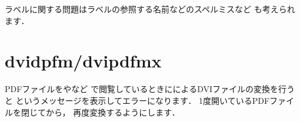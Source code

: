 ラベルに関する問題はラベルの参照する名前などのスペルミスなど
も考えられます．






\section{dvidpfm/dvipdfmx}

%
%
PDFファイルをやなど
で閲覧しているときに\Dvipdfmx によるDVIファイルの変換を行うと
というメッセージを表示してエラーになります．
{1度開いているPDFファイルを閉じてから}，
再度変換するようにします．
